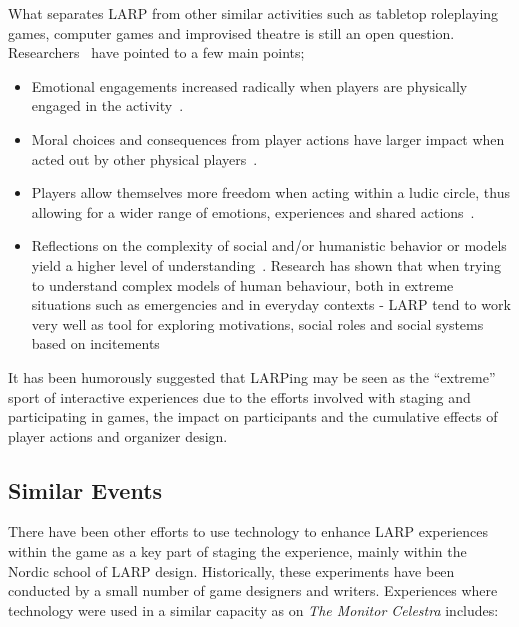 What separates LARP from other similar activities such as tabletop
roleplaying games, computer games and improvised theatre is still an
open question. Researchers~\cite{montola2012,turku3,henriksen2004}
have pointed to a few main points; 

\begin{itemize}
\item Emotional engagements increased radically when players are physically engaged in the activity~\cite{turku3}.
\item Moral choices and consequences from player actions have larger impact when acted out by other physical players~\cite{turku3}.
\item Players allow themselves more freedom when acting within a ludic circle, thus allowing for a wider range of emotions, experiences and shared actions~\cite{montola2012,stenros2012}.
\item Reflections on the complexity of social and/or humanistic behavior or models yield a higher level of understanding~\cite{henriksen2004}. Research has shown that when trying to understand complex models of human behaviour, both in extreme situations such as emergencies and in everyday contexts - LARP tend to work very well as tool for exploring motivations, social roles and social systems based on incitements
\end{itemize}

It has been humorously suggested that LARPing may be seen as the ``extreme'' sport of interactive experiences due to the efforts involved with staging and participating in games, the impact on participants and the cumulative effects of player actions and organizer design.

\subsection{Similar Events}

There have been other efforts to use technology to enhance LARP experiences within the game as a key part of staging the experience, mainly within the Nordic school of LARP design. Historically, these experiments have been conducted by a small number of game designers and writers. Experiences where technology were used in a similar capacity as on \emph{The Monitor Celestra} includes: 

